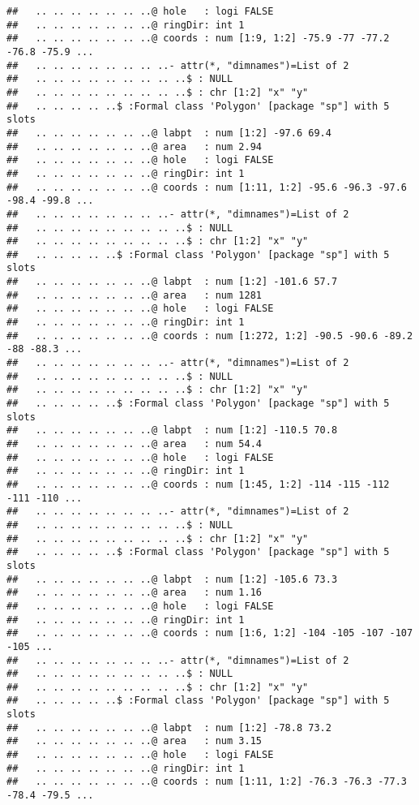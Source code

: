 \documentclass[]{article}
\begin{document}
\begin{verbatim}
##   .. .. .. .. .. .. ..@ hole   : logi FALSE
##   .. .. .. .. .. .. ..@ ringDir: int 1
##   .. .. .. .. .. .. ..@ coords : num [1:9, 1:2] -75.9 -77 -77.2 -76.8 -75.9 ...
##   .. .. .. .. .. .. .. ..- attr(*, "dimnames")=List of 2
##   .. .. .. .. .. .. .. .. ..$ : NULL
##   .. .. .. .. .. .. .. .. ..$ : chr [1:2] "x" "y"
##   .. .. .. .. ..$ :Formal class 'Polygon' [package "sp"] with 5 slots
##   .. .. .. .. .. .. ..@ labpt  : num [1:2] -97.6 69.4
##   .. .. .. .. .. .. ..@ area   : num 2.94
##   .. .. .. .. .. .. ..@ hole   : logi FALSE
##   .. .. .. .. .. .. ..@ ringDir: int 1
##   .. .. .. .. .. .. ..@ coords : num [1:11, 1:2] -95.6 -96.3 -97.6 -98.4 -99.8 ...
##   .. .. .. .. .. .. .. ..- attr(*, "dimnames")=List of 2
##   .. .. .. .. .. .. .. .. ..$ : NULL
##   .. .. .. .. .. .. .. .. ..$ : chr [1:2] "x" "y"
##   .. .. .. .. ..$ :Formal class 'Polygon' [package "sp"] with 5 slots
##   .. .. .. .. .. .. ..@ labpt  : num [1:2] -101.6 57.7
##   .. .. .. .. .. .. ..@ area   : num 1281
##   .. .. .. .. .. .. ..@ hole   : logi FALSE
##   .. .. .. .. .. .. ..@ ringDir: int 1
##   .. .. .. .. .. .. ..@ coords : num [1:272, 1:2] -90.5 -90.6 -89.2 -88 -88.3 ...
##   .. .. .. .. .. .. .. ..- attr(*, "dimnames")=List of 2
##   .. .. .. .. .. .. .. .. ..$ : NULL
##   .. .. .. .. .. .. .. .. ..$ : chr [1:2] "x" "y"
##   .. .. .. .. ..$ :Formal class 'Polygon' [package "sp"] with 5 slots
##   .. .. .. .. .. .. ..@ labpt  : num [1:2] -110.5 70.8
##   .. .. .. .. .. .. ..@ area   : num 54.4
##   .. .. .. .. .. .. ..@ hole   : logi FALSE
##   .. .. .. .. .. .. ..@ ringDir: int 1
##   .. .. .. .. .. .. ..@ coords : num [1:45, 1:2] -114 -115 -112 -111 -110 ...
##   .. .. .. .. .. .. .. ..- attr(*, "dimnames")=List of 2
##   .. .. .. .. .. .. .. .. ..$ : NULL
##   .. .. .. .. .. .. .. .. ..$ : chr [1:2] "x" "y"
##   .. .. .. .. ..$ :Formal class 'Polygon' [package "sp"] with 5 slots
##   .. .. .. .. .. .. ..@ labpt  : num [1:2] -105.6 73.3
##   .. .. .. .. .. .. ..@ area   : num 1.16
##   .. .. .. .. .. .. ..@ hole   : logi FALSE
##   .. .. .. .. .. .. ..@ ringDir: int 1
##   .. .. .. .. .. .. ..@ coords : num [1:6, 1:2] -104 -105 -107 -107 -105 ...
##   .. .. .. .. .. .. .. ..- attr(*, "dimnames")=List of 2
##   .. .. .. .. .. .. .. .. ..$ : NULL
##   .. .. .. .. .. .. .. .. ..$ : chr [1:2] "x" "y"
##   .. .. .. .. ..$ :Formal class 'Polygon' [package "sp"] with 5 slots
##   .. .. .. .. .. .. ..@ labpt  : num [1:2] -78.8 73.2
##   .. .. .. .. .. .. ..@ area   : num 3.15
##   .. .. .. .. .. .. ..@ hole   : logi FALSE
##   .. .. .. .. .. .. ..@ ringDir: int 1
##   .. .. .. .. .. .. ..@ coords : num [1:11, 1:2] -76.3 -76.3 -77.3 -78.4 -79.5 ...

\end{verbatim}
\end{document}
